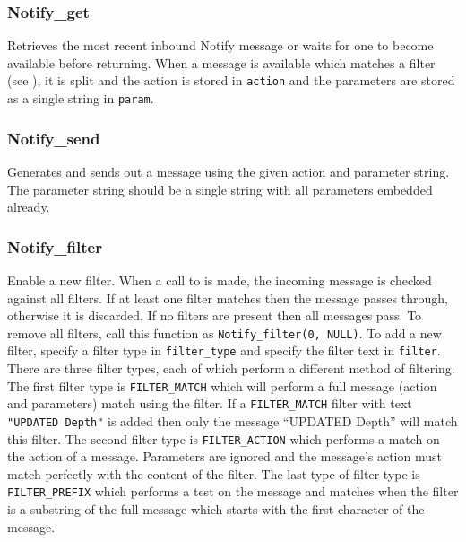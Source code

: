 \subsubsection{Notify\_get} \label{apinotifyget}
 Retrieves the most recent
inbound Notify message or waits for one to become available before
returning. When a message is available which matches a filter (see
), it is split and the action is
stored in \texttt{action} and the parameters are stored as a single string in
\texttt{param}.

\subsubsection{Notify\_send} \label{apinotifysend}
 Generates and sends
out a message using the given action and parameter string. The
parameter string should be a single string with all parameters
embedded already.

\subsubsection{Notify\_filter} \label{apinotifyfilter}
 Enable a new
filter. When a call to  is made,
the incoming message is checked against all filters. If at least one filter
matches then the message passes through, otherwise it is discarded. If no
filters are present then all messages pass. To remove all filters, call this
function as \lstinline[language=Cextended]!Notify_filter(0, NULL)!.  To add a
new filter, specify a filter type in \texttt{filter\_type} and specify the
filter text in \texttt{filter}. There are three filter types, each of which
perform a different method of filtering. The first filter type is
\texttt{FILTER\_MATCH} which will perform a full message (action and parameters)
match using the filter. If a \texttt{FILTER\_MATCH} filter with text
\lstinline[language=Cextended]!"UPDATED Depth"! is added then only the message
``UPDATED Depth'' will match this filter. The second filter type is
\texttt{FILTER\_ACTION} which performs a match on the action of a
message. Parameters are ignored and the message's action must match perfectly
with the content of the filter. The last type of filter type is
\texttt{FILTER\_PREFIX} which performs a test on the message and matches when
the filter is a substring of the full message which starts with the first
character of the message.

